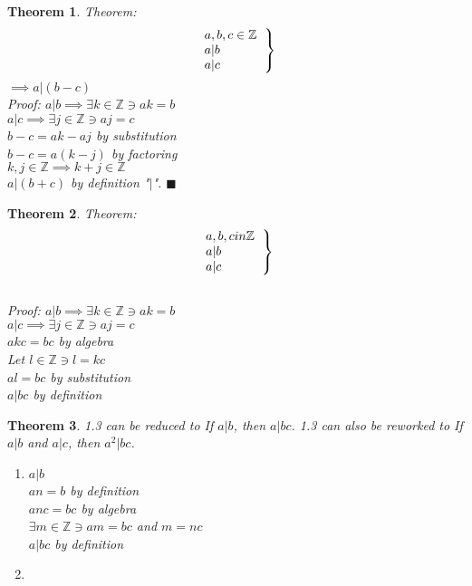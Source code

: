 \documentclass{article}
\newtheorem{theorem}{Theorem}[section]
\begin{document}
\begin{theorem}
	Theorem:
	\[ \left .
		\begin{tabular}{l}
			$a,b,c \in \mathbb{Z}$\\
			$a | b$\\
			$a | c$\\
		\end{tabular}
	\right \}\]
$\implies a|(b-c)$\\ 
Proof: $a|b \implies \exists k \in \mathbb{Z} \ni ak = b$\\
$a|c \implies \exists j \in \mathbb{Z} \ni aj = c$\\
$b-c=ak-aj$ by substitution\\
$b-c=a(k-j)$ by factoring\\
$k,j \in \mathbb{Z} \implies k+j \in \mathbb{Z}$\\
$a|(b+c)$ by definition "$|$". $\blacksquare$ \\
\end{theorem}\begin{theorem}
	Theorem:
	\[ \left .
		\begin{tabular}{l}
			$a,b,c in \mathbb{Z}$\\
			$a|b$\\
			$a|c$\\
		\end{tabular}
	\right \}
\]
\\
Proof: $a|b \implies \exists k \in \mathbb{Z} \ni ak = b$\\
$a|c \implies \exists j \in \mathbb{Z} \ni aj = c$\\
$akc = bc$ by algebra\\
Let $l \in \mathbb{Z} \ni l=kc$\\
$al = bc$ by substitution\\
$a|bc$ by definition\\
\end{theorem}\begin{theorem}	\emph{1.3} can be reduced to \emph{If $a|b$, then $a|bc$.} \emph{1.3} can also be reworked to \emph{If $a|b$ and $a|c$, then $a^2|bc$.}
	\begin{enumerate}
		\item
			$a|b$\\
			$an=b$ by definition\\
			$anc=bc$ by algebra\\
			$\exists m \in \mathbb{Z} \ni am=bc$ and $m=nc$\\
			$a|bc$ by definition\\
		\item

\end{enumerate}
\end{theorem}
\end{document}
